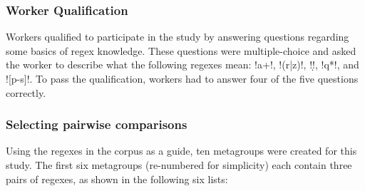 \subsubsection{Worker Qualification}
Workers qualified to participate in the study by answering questions regarding some basics of regex knowledge. These questions were multiple-choice and asked the worker to describe what the following regexes mean: \cverb!a+!, \cverb!(r|z)!, \cverb!\d!, \cverb!q*!, and \cverb![p-s]!. To pass the qualification, workers had to answer four of the five questions correctly.

\subsubsection{Selecting pairwise comparisons}

 Using the regexes in the corpus as a guide, ten metagroups were created for this study.  The first six metagroups (re-numbered for simplicity) each contain three pairs of regexes, as shown in the following six lists:

